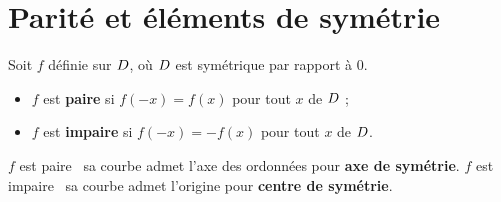 \section{Parité et éléments de symétrie}

\begin{definition}
Soit $f$ définie sur $D$, où $D$ est symétrique par rapport à $0$.
\begin{itemize}[leftmargin=1.3em, itemsep=0.15em]
  \item $f$ est \textbf{paire} si $f(-x) = f(x)$ pour tout $x$ de $D$ ;
  \item $f$ est \textbf{impaire} si $f(-x) = -f(x)$ pour tout $x$ de $D$.
\end{itemize}
\end{definition}

\begin{theoreme}
$f$ est paire \ssi\ sa courbe admet l'axe des ordonnées pour \textbf{axe de
symétrie}. $f$ est impaire \ssi\ sa courbe admet l'origine pour
\textbf{centre de symétrie}.
\end{theoreme}

